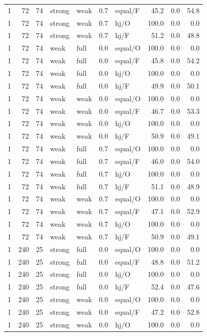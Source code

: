 {\begin{longtable}{@{}rrrllllrrr@{}}
1 & 72 & 74 & strong & weak & 0.7 & equal/F & 45.2 & 0.0 & 54.8\\
1 & 72 & 74 & strong & weak & 0.7 & hj/O & 100.0 & 0.0 & 0.0\\
1 & 72 & 74 & strong & weak & 0.7 & hj/F & 51.2 & 0.0 & 48.8\\
1 & 72 & 74 & weak & full & 0.0 & equal/O & 100.0 & 0.0 & 0.0\\
1 & 72 & 74 & weak & full & 0.0 & equal/F & 45.8 & 0.0 & 54.2\\
1 & 72 & 74 & weak & full & 0.0 & hj/O & 100.0 & 0.0 & 0.0\\
1 & 72 & 74 & weak & full & 0.0 & hj/F & 49.9 & 0.0 & 50.1\\
1 & 72 & 74 & weak & weak & 0.0 & equal/O & 100.0 & 0.0 & 0.0\\
1 & 72 & 74 & weak & weak & 0.0 & equal/F & 46.7 & 0.0 & 53.3\\
1 & 72 & 74 & weak & weak & 0.0 & hj/O & 100.0 & 0.0 & 0.0\\
1 & 72 & 74 & weak & weak & 0.0 & hj/F & 50.9 & 0.0 & 49.1\\
1 & 72 & 74 & weak & full & 0.7 & equal/O & 100.0 & 0.0 & 0.0\\
1 & 72 & 74 & weak & full & 0.7 & equal/F & 46.0 & 0.0 & 54.0\\
1 & 72 & 74 & weak & full & 0.7 & hj/O & 100.0 & 0.0 & 0.0\\
1 & 72 & 74 & weak & full & 0.7 & hj/F & 51.1 & 0.0 & 48.9\\
1 & 72 & 74 & weak & weak & 0.7 & equal/O & 100.0 & 0.0 & 0.0\\
1 & 72 & 74 & weak & weak & 0.7 & equal/F & 47.1 & 0.0 & 52.9\\
1 & 72 & 74 & weak & weak & 0.7 & hj/O & 100.0 & 0.0 & 0.0\\
1 & 72 & 74 & weak & weak & 0.7 & hj/F & 50.9 & 0.0 & 49.1\\
1 & 240 & 25 & strong & full & 0.0 & equal/O & 100.0 & 0.0 & 0.0\\
1 & 240 & 25 & strong & full & 0.0 & equal/F & 48.8 & 0.0 & 51.2\\
1 & 240 & 25 & strong & full & 0.0 & hj/O & 100.0 & 0.0 & 0.0\\
1 & 240 & 25 & strong & full & 0.0 & hj/F & 52.4 & 0.0 & 47.6\\
1 & 240 & 25 & strong & weak & 0.0 & equal/O & 100.0 & 0.0 & 0.0\\
1 & 240 & 25 & strong & weak & 0.0 & equal/F & 47.2 & 0.0 & 52.8\\
1 & 240 & 25 & strong & weak & 0.0 & hj/O & 100.0 & 0.0 & 0.0\\

\end{longtable}}

